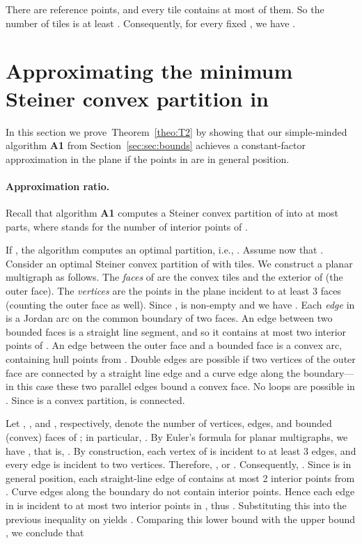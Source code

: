 \documentclass[11pt]{article}
\def\ie{{i.e.}}
\newcommand{\seclab}[1]{\label{sec:#1}}
\newcommand{\secref}[1]{Section~\ref{sec:#1}}
\newcommand{\thmref}[1]{Theorem~\ref{theo:#1}}
\begin{document}
There are  reference points, and every tile contains at most
 of them. So the number of tiles is at least . Consequently, for every fixed , we
have .


\section{Approximating the minimum Steiner convex partition in }
\seclab{sec:steiner}

In this section we prove~\thmref{T2} by showing that our simple-minded
algorithm {\bf A1} from \secref{sec:bounds} achieves a constant-factor
approximation in the plane if the points in  are in general
position.

\paragraph{Approximation ratio.}  Recall that algorithm
{\bf A1} computes a Steiner convex partition of  into at most
 parts, where  stands for the number of
interior points of .

If , the algorithm computes an optimal partition, \ie,
. Assume now that .  Consider an optimal
Steiner convex partition  of  with  tiles.  We construct a
planar multigraph  as follows. The \emph{faces} of  are
the convex tiles and the exterior of  (the outer face).  The
\emph{vertices}  are the points in the plane incident to at least 3
faces (counting the outer face as well). Since ,  is
non-empty and we have . Each \emph{edge} in  is a
Jordan arc on the common boundary of two faces. An edge between two
bounded faces is a straight line segment, and so it contains at most
two interior points of . An edge between the outer face and a
bounded face is a convex arc, containing hull points from . Double
edges are possible if two vertices of the outer face are connected by
a straight line edge and a curve edge along the boundary---in this
case these two parallel edges bound a convex face. No loops are
possible in . Since  is a convex partition,  is connected.

Let , , and , respectively, denote the number of vertices,
edges, and bounded (convex) faces of ; in particular, .  By
Euler's formula for planar multigraphs, we have , that is,
.  By construction, each vertex of  is incident to at
least 3 edges, and every edge is incident to two vertices. Therefore,
, or .  Consequently, .  Since  is in general position, each straight-line
edge of  contains at most 2 interior points from . Curve edges
along the boundary do not contain interior points. Hence each edge in
 is incident to at most two interior points in , thus .  Substituting this into the previous inequality on  yields
.  Comparing this lower bound with the
upper bound , we conclude that
\end{document}
